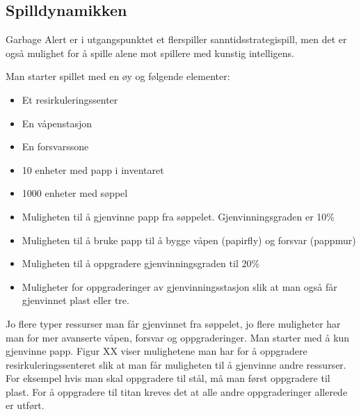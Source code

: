 
\subsection{Spilldynamikken}

Garbage Alert er i utgangspunktet et flerspiller sanntidsstrategispill, men det er også mulighet for å spille alene mot spillere med kunstig intelligens. 

Man starter spillet med en øy og følgende elementer:

\begin{itemize}
	\item Et resirkuleringssenter
	\item En våpenstasjon
	\item En forsvarssone
	\item 10 enheter med papp i inventaret
	\item 1000 enheter med søppel
	\item Muligheten til å gjenvinne papp fra søppelet. Gjenvinningsgraden er 10\%
	\item Muligheten til å bruke papp til å bygge våpen (papirfly) og forsvar (pappmur)
	\item Muligheten til å oppgradere gjenvinningsgraden til 20\%
	\item Muligheter for oppgraderinger av gjenvinningsstasjon slik at man også får gjenvinnet plast eller tre.
\end{itemize}

Jo flere typer ressurser man får gjenvinnet fra søppelet, jo flere muligheter har man for mer avanserte våpen, forsvar og oppgraderinger. Man starter med å kun gjenvinne papp. Figur XX viser mulighetene man har for å oppgradere resirkuleringssenteret slik at man får muligheten til å gjenvinne andre ressurser. For eksempel hvis man skal oppgradere til stål, må man først oppgradere til plast. For å oppgradere til titan kreves det at alle andre oppgraderinger allerede er utført. \\

